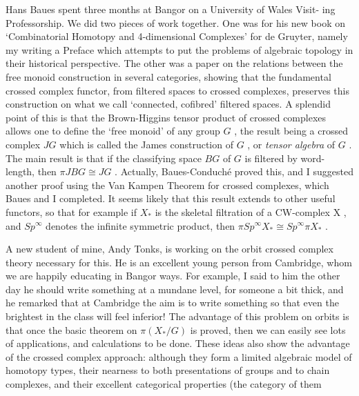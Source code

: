 Hans Baues spent three months at Bangor on a University of Wales Visit-%
ing Professorship. We did two pieces of work together. One was for his new
book on `Combinatorial Homotopy and 4-dimensional Complexes' for de Gruyter,
namely my writing a Preface which attempts to put the problems of algebraic
topology in their historical perspective. The other was a paper on the
relations between the free monoid construction in several categories,
showing that the fundamental crossed complex functor, from filtered spaces
to crossed complexes, preserves this construction on what we call
`connected, cofibred' filtered spaces. A splendid point of this is that the
Brown-Higgins tensor product of crossed complexes allows one to define the
`free monoid' of any group $G$ , the result being a crossed complex $JG$
which is called the James construction of $G$ , or \textit{tensor algebra} of $G$ .
The main result is that if the classifying space $BG$ of $G$ is filtered by
word-length, then $\pi JBG \cong JG$ . Actually, Baues-Conduché proved this, and I
suggested another proof using the Van Kampen Theorem for crossed complexes,
which Baues and I completed. It seems likely that this result extends to
other useful functors, so that for example if $X_*$ is the skeletal
filtration of a CW-complex X , and $Sp^{\infty}$ denotes the infinite symmetric
product, then $\pi Sp^{\infty} X_* \cong Sp^{\infty} \pi X_*$ .

A new student of mine, Andy Tonks, is working on the orbit crossed
complex theory necessary for this. He is an excellent young person from
Cambridge, whom we are happily educating in Bangor ways. For example, I
said to him the other day he should write something at a mundane level, for
someone a bit thick, and he remarked that at Cambridge the aim is to write
something so that even the brightest in the class will feel inferior! The
advantage of this problem on orbits is that once the basic theorem on
$\pi(X_*/G)$ is proved, then we can easily see lots of applications, and
calculations to be done. These ideas also show the advantage of the crossed
complex approach: although they form a limited algebraic model of homotopy
types, their nearness to both presentations of groups and to chain
complexes, and their excellent categorical properties (the category of them


